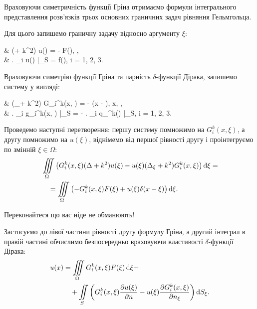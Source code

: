 Враховуючи симетричність функції Гріна отримаємо формули інтегрального представлення розв'язків трьох основних граничних задач рівняння Гельмгольца. \medskip

Для цього запишемо граничну задачу відносно аргументу $\xi$:
\begin{system}
	& (\Delta + k^2) u(\xi) = - F(\xi), \quad \xi \in \Omega, \\
	& \left. \ell_i u(\xi) \right|_{\xi \in S} = f(\xi), \quad i = 1, 2, 3.
\end{system}

Враховуючи симетрію функції Гріна та парність $\delta$-функції Дірака, запишемо систему у вигляді:
\begin{system}
	& (\Delta_\xi + k^2) G_i^k(x, \xi) = - \delta(x - \xi), \quad x, \xi \in \Omega, \\
	& \left. \ell_i g_i^k(x, \xi) \right|_{\xi \in S} = - \left. \ell_i q_\pm^k(\xi) \right|_{\xi \in S}, \quad i = 1, 2, 3.
\end{system}

Проведемо наступні перетворення: першу систему помножимо на $G_i^k(x, \xi)$, а другу помножимо на $u(\xi)$, віднімемо від першої рівності другу і проінтегруємо по змінній $\xi \in \Omega$:
\begin{equation}
	\begin{aligned}
		& \displaystyle\iiint\limits_\Omega \left( G_i^k(x, \xi) (\Delta + k^2) u(\xi) - u(\xi) (\Delta_\xi + k^2) G_i^k(x, \xi) \right) \mathop{}\!\mathrm{d} \xi = \\
		& \quad = \displaystyle\iiint\limits_\Omega \left( - G_i^k(x, \xi) F(\xi) + u(\xi) \delta(x - \xi) \right) \mathop{}\!\mathrm{d} \xi.
	\end{aligned}
\end{equation}

\begin{exercise}
	Переконайтеся що вас ніде не обманюють!
\end{exercise}

Застосуємо до лівої частини рівності другу формулу Гріна, а другий інтеграл в правій частині обчислимо безпосередньо враховуючи властивості $\delta$-функції Дірака:
\begin{equation}
	\begin{aligned}
		u(x) & = \displaystyle\iiint\limits_\Omega G_i^k(x, \xi) F(\xi) \mathop{}\!\mathrm{d} \xi + \\
		& \quad + \displaystyle\iint\limits_S \left( G_i^k(x, \xi) \frac{\partial u(\xi)}{\partial n} - u(\xi) \frac{\partial G_i^k(x, \xi)}{\partial n_\xi} \right) \mathop{}\!\mathrm{d} S_\xi.
	\end{aligned}
\end{equation}

